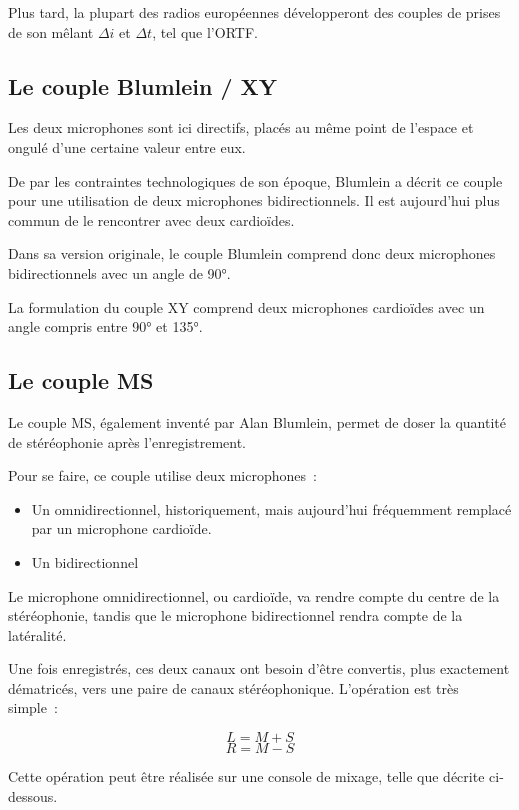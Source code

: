 \documentclass[
]{book}
\providecommand{\tightlist}{%
  \setlength{\itemsep}{0pt}\setlength{\parskip}{0pt}}
\begin{document}
Plus tard, la plupart des radios européennes développeront des couples de prises de son mêlant \(\Delta i\) et \(\Delta t\), tel que l'ORTF.

\hypertarget{le-couple-blumlein-xy}{%
\subsection{Le couple Blumlein / XY}\label{le-couple-blumlein-xy}}

Les deux microphones sont ici directifs, placés au même point de l'espace et ongulé d'une certaine valeur entre eux.

De par les contraintes technologiques de son époque, Blumlein a décrit ce couple pour une utilisation de deux microphones bidirectionnels. Il est aujourd'hui plus commun de le rencontrer avec deux cardioïdes.

Dans sa version originale, le couple Blumlein comprend donc deux microphones bidirectionnels avec un angle de 90°.

La formulation du couple XY comprend deux microphones cardioïdes avec un angle compris entre 90° et 135°.

\hypertarget{le-couple-ms}{%
\subsection{Le couple MS}\label{le-couple-ms}}

Le couple MS, également inventé par Alan Blumlein, permet de doser la quantité de stéréophonie après l'enregistrement.

Pour se faire, ce couple utilise deux microphones~:

\begin{itemize}
\tightlist
\item
  Un omnidirectionnel, historiquement, mais aujourd'hui fréquemment remplacé par un microphone cardioïde.
\item
  Un bidirectionnel
\end{itemize}

Le microphone omnidirectionnel, ou cardioïde, va rendre compte du centre de la stéréophonie, tandis que le microphone bidirectionnel rendra compte de la latéralité.

Une fois enregistrés, ces deux canaux ont besoin d'être convertis, plus exactement dématricés, vers une paire de canaux stéréophonique. L'opération est très simple~:

\[L = M+S\]
\[R = M-S\]

Cette opération peut être réalisée sur une console de mixage, telle que décrite ci-dessous.
\end{document}
